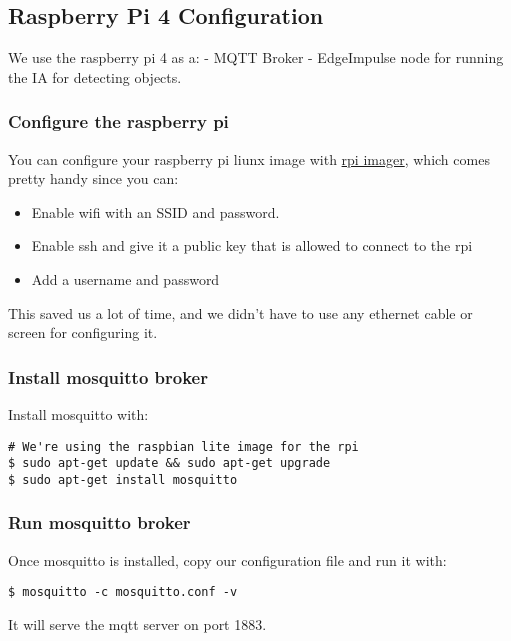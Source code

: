 \subsection{Raspberry Pi 4 Configuration}\label{raspberry-pi-4-configuration}

We use the raspberry pi 4 as a: - MQTT Broker - EdgeImpulse node for
running the IA for detecting objects.

\subsubsection{Configure the raspberry pi}\label{configure-the-raspberry-pi}

You can configure your raspberry pi liunx image with
\href{https://github.com/raspberrypi/rpi-imager}{rpi imager}, which
comes pretty handy since you can:

\begin{itemize}
\item
  Enable wifi with an SSID and password.
\item
  Enable ssh and give it a public key that is allowed to connect to the
  rpi
\item
  Add a username and password
\end{itemize}

This saved us a lot of time, and we didn't have to use any ethernet
cable or screen for configuring it.

\subsubsection{Install mosquitto broker}\label{install-mosquitto-broker}

Install mosquitto with:

\begin{verbatim}
# We're using the raspbian lite image for the rpi
$ sudo apt-get update && sudo apt-get upgrade
$ sudo apt-get install mosquitto
\end{verbatim}

\subsubsection{Run mosquitto broker}\label{run-mosquitto-broker}

Once mosquitto is installed, copy our configuration file and run it
with:

\begin{verbatim}
$ mosquitto -c mosquitto.conf -v
\end{verbatim}

It will serve the mqtt server on port 1883.

\subsubsection{}\label{section}
